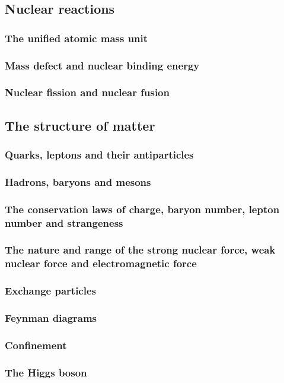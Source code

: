 \subsection{Nuclear reactions}

\subsubsection{The unified atomic mass unit}


\subsubsection{Mass defect and nuclear binding energy}


\subsubsection{Nuclear fission and nuclear fusion}


\subsection{The structure of matter}

\subsubsection{Quarks, leptons and their antiparticles}


\subsubsection{Hadrons, baryons and mesons}


\subsubsection{The conservation laws of charge, baryon number, lepton number
and strangeness}


\subsubsection{The nature and range of the strong nuclear force, weak nuclear
force and electromagnetic force}


\subsubsection{Exchange particles}


\subsubsection{Feynman diagrams}


\subsubsection{Confinement}


\subsubsection{The Higgs boson}





